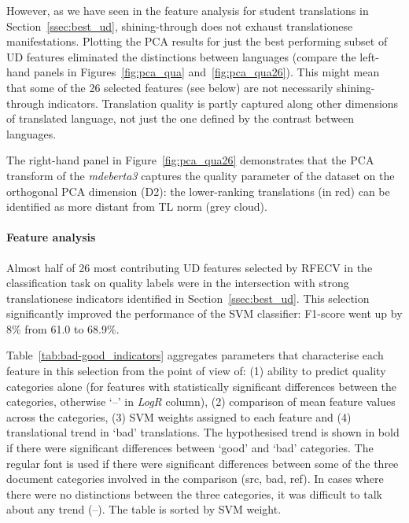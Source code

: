 However, as we have seen in the feature analysis for student translations in Section~\ref{ssec:best_ud}, shining-through does not exhaust translationese manifestations. Plotting the PCA results for just the best performing subset of UD features eliminated the distinctions between languages (compare the left-hand panels in Figures~\ref{fig:pca_qua} and~\ref{fig:pca_qua26}). This might mean that some of the 26 selected features (see below) are not necessarily shining-through indicators. Translation quality is partly captured along other dimensions of translated language, not just the one defined by the contrast between languages. 

The right-hand panel in Figure~\ref{fig:pca_qua26} demonstrates that the PCA transform of the \textit{mdeberta3} captures the quality parameter of the dataset on the orthogonal PCA dimension (D2): the lower-ranking translations (in red) can be identified as more distant from TL norm (grey cloud). 

\paragraph{\label{pg:selection_helps_in_quality_classification}Feature analysis} 
Almost half of 26 most contributing UD features selected by RFECV in the classification task on quality labels were in the intersection with strong translationese indicators identified in Section~\ref{ssec:best_ud}. This selection significantly improved the performance of the SVM classifier: F1-score went up by 8\% from 61.0 to 68.9\%. 

Table~\ref{tab:bad-good_indicators} aggregates parameters that characterise each feature in this selection from the point of view of: (1) ability to predict quality categories alone (for features with statistically significant differences between the categories, otherwise `--' in \textit{LogR} column), (2) comparison of mean feature values across the categories, (3) SVM weights assigned to each feature and (4) translational trend in `bad' translations. 
The hypothesised trend is shown in bold if there were significant differences between `good' and `bad' categories. The regular font is used if there were significant differences between some of the three document categories involved in the comparison (src, bad, ref). In cases where there were no distinctions between the three categories, it was difficult to talk about any trend (--). The table is sorted by SVM weight.

